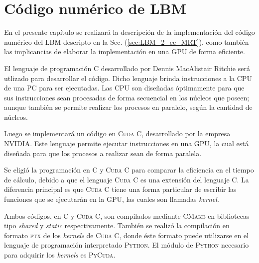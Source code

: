 \chapter{Código numérico de LBM}
\graphicspath{{figs/cap3/}}
\label{cap3}




En el presente capítulo se realizará la descripción de la implementación del código numérico del LBM descripto en la Sec. (\ref{sec:LBM_2_ec_MRT}), como también las implicancias de elaborar la implementación en una GPU de forma eficiente.

El lenguaje de programación \textsc{C} desarrollado por Dennis MacAlistair Ritchie será utlizado para desarrollar el código. Dicho lenguaje brinda instrucciones a la CPU de una PC para ser ejecutadas. Las CPU son diseñadas óptimamente para que sus instrucciones sean procesadas de forma secuencial en los núcleos que poseen; aunque también se permite realizar los procesos en paralelo, según la cantidad de núcleos.

Luego se implementará un código en \textsc{Cuda C}, desarrollado por la empresa NVIDIA. Este lenguaje permite ejecutar instrucciones en una GPU, la cual está diseñada para que los procesos a realizar sean de forma paralela.

Se eligió la programación en \textsc{C} y \textsc{Cuda C} para comparar la eficiencia en el tiempo de cálculo, debido a que el lenguaje \textsc{Cuda C} es una extensión del lenguaje \textsc{C}. La diferencia principal es que \textsc{Cuda C}  tiene una forma particular de escribir las funciones que se ejecutarán en la GPU, las cuales son llamadas \textit{kernel}.

Ambos códigos, en \textsc{C} y \textsc{Cuda C}, son compilados mediante \textsc{CMake} en bibliotecas tipo \textit{shared} y \textit{static} respectivamente. También se realizó la compilación en formato \textsc{ptx} de los \textit{kernels} de \textsc{Cuda C}, donde éste formato puede utilizarse en el lenguaje de programación interpretado \textsc{Python}. El módulo de \textsc{Python} necesario para adquirir los \textit{kernels} es \textsc{PyCuda}.

